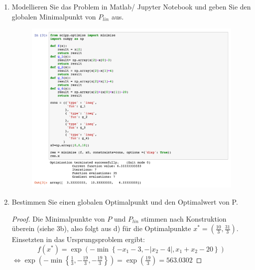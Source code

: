 \documentclass[12pt]{extreport} %
\theoremstyle{named}
\theoremstyle{nnamed}
\theoremstyle{itshape}
\theoremstyle{normal}
\begin{document}
\begin{enumerate}
\begin{proof}
\begin{align}
				 x_2 \in [4 - \alpha, 4 + \alpha], ~  \tag*{$(*)$}
			\end{align}
			d.h. $x_2$ liegt in einer nicht-leeren, abgeschlossenen Menge. Aus den Restriktionen erhalten wir außerdem
			\begin{align}
				 x_1 \in  [20 - x_2 - \alpha, \alpha - 3], ~  \tag*{$(**)$}
			\end{align}
			Diese Menge ist für $\alpha > \frac{19}{3}$ nicht leer und abgeschlossen, da für $x_2 = 4 + \alpha$:
			 $$ 20 - x_2 - \alpha < \alpha - 3 \iff 23 - ( 4 + \alpha ) < 2 \alpha \iff \alpha > \frac{19}{3}. $$
			Somit liefert ein $\beta > \frac{19}{3}$, dass $f(\alpha) = \alpha \in \left[\frac{19}{3}, \beta \right]$ beschränkt ist. Das in Kombination mit $(*)$ bzw. $(**)$ liefert die Beschränktheit von $x_1, x_2$. Zusammengefasst ist für ein $\beta > \frac{19}{3}$ die Menge
				$$ \big\{ (\alpha, x) \in M | f(\alpha) = \alpha \leq \beta \big\} $$
				nicht-leer und kompakt und der  verschärfte Satz von Weierstraß garantiert die Lösbarkeit des Problems.
		\end{proof} ~\newpage
	\item Modellieren Sie das Problem in Matlab/ Jupyter Notebook und geben Sie den globalen Minimalpunkt von $P_{lin}$ aus.

		\begin{figure}[h!] 	\centering
  			\includegraphics[scale=0.55]{img/suiii-vi}
  			\label{fig:fig3}
		\end{figure}
	\item Bestimmen Sie einen globalen Optimalpunkt und den Optimalwert von P.
		\begin{proof}
			Die Minimalpunkte von $P$ und $P_{lin}$ stimmen nach Konstruktion überein (siehe 3b), also folgt aus d) für die Optimalpunkte $x^*=(\frac{10}{3}, \frac{31}{3})$.\\
			Einsetzten in das Ursprungsproblem ergibt: 
			$$f(x^*)= \exp (-\min\left\{ -x_1-3, -|x_2-4|, x_1+x_2-20\right\}) $$
			$\iff \exp\left(-\min\left\{ \frac{1}{3}, -\frac{19}{3}, -\frac{19}{3} \right\}\right) = \exp( \frac{19}{3}) =  563.0302$
		\end{proof}
\end{enumerate}
\end{document}
